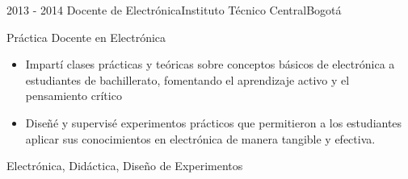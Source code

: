 \begin{experiences}
  \experience
  {2013 - 2014}  {Docente de Electrónica}{Instituto Técnico Central}{Bogotá}
  {}   {
          Práctica Docente en Electrónica  
          \begin{itemize}
            \item Impartí clases prácticas y teóricas sobre conceptos básicos de electrónica a estudiantes de bachillerato, fomentando el aprendizaje activo y el pensamiento crítico
            \item Diseñé y supervisé experimentos prácticos que permitieron a los estudiantes aplicar sus conocimientos en electrónica de manera tangible y efectiva.
          \end{itemize}
     }
     {Electrónica, Didáctica, Diseño de Experimentos}
\end{experiences}
